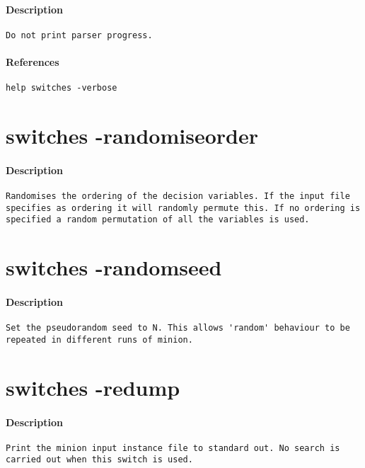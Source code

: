 \paragraph{Description}
{\footnotesize
\begin{verbatim}
Do not print parser progress.
\end{verbatim}
}
\paragraph{References}
{\footnotesize
\begin{verbatim}
help switches -verbose
\end{verbatim}
}
\section{switches -randomiseorder}
\paragraph{Description}
{\footnotesize
\begin{verbatim}
Randomises the ordering of the decision variables. If the input file
specifies as ordering it will randomly permute this. If no ordering is
specified a random permutation of all the variables is used.
\end{verbatim}
}
\section{switches -randomseed}
\paragraph{Description}
{\footnotesize
\begin{verbatim}
Set the pseudorandom seed to N. This allows 'random' behaviour to be
repeated in different runs of minion.
\end{verbatim}
}
\section{switches -redump}
\paragraph{Description}
{\footnotesize
\begin{verbatim}
Print the minion input instance file to standard out. No search is
carried out when this switch is used.
\end{verbatim}
}
